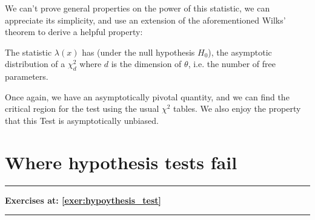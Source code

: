 We can't prove general properties on the power of this statistic, we can appreciate its simplicity, and use an extension of the aforementioned Wilks' theorem to derive a helpful property:

\begin{theorem}
	The statistic $\lambda(x)$ has (under the null hypothesis $H_0$), the asymptotic distribution of a $\chi^2_d$ where $d$ is the dimension of $\theta$, i.e. the number of free parameters.
\end{theorem}


Once again, we have an asymptotically pivotal quantity, and we can find the critical region for the test using the usual $\chi^2$ tables. We also enjoy the property that this Test is asymptotically unbiased.

\section{Where hypothesis tests fail}

\vspace*{1cm}
\hrule
\begin{center}
	\textbf{Exercises at: \ref{exer:hypoythesis_test}}
\end{center}
\hrule
